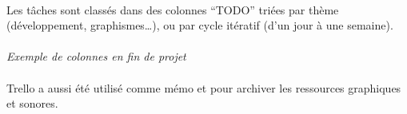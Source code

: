 \paragraph{}
Les tâches sont classés dans des colonnes “TODO” triées par thème (développement, graphismes…), ou par cycle itératif (d’un jour à une semaine).

\paragraph{}
\noindent
{}
\begin{center}
\textit{Exemple de colonnes en fin de projet}
\end{center}

\paragraph{}
Trello a aussi été utilisé comme mémo et pour archiver les ressources graphiques et sonores.

